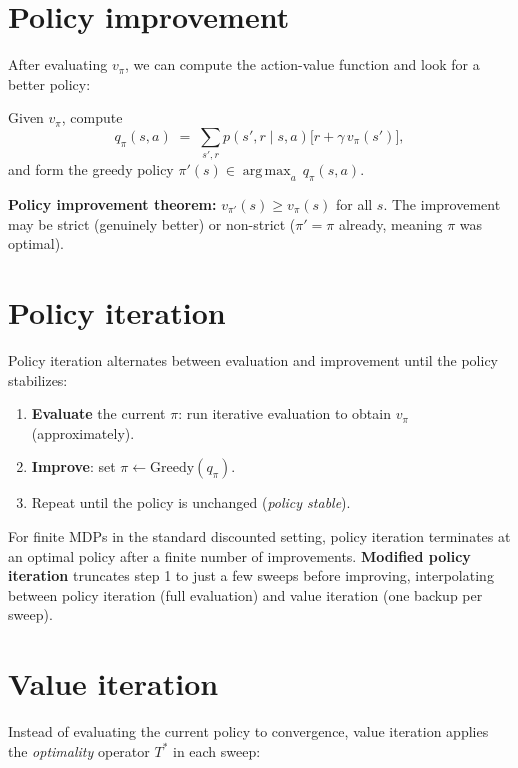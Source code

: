 \documentclass[11pt, oneside]{book}
\newcommand{\argmax}{\operatorname*{arg\,max}}
\begin{document}
\section{Policy improvement}

After evaluating $v_\pi$, we can compute the action-value function and look
for a better policy:

\begin{thmbox}[title={Policy Improvement}]
Given $v_\pi$, compute
\[
  q_\pi(s,a) \;=\; \sum_{s',r} p(s',r\mid s,a)\bigl[r + \gamma\,v_\pi(s')\bigr],
\]
and form the greedy policy $\pi'(s) \in \argmax_a\,q_\pi(s,a)$.

\textbf{Policy improvement theorem:} $v_{\pi'}(s) \ge v_\pi(s)$ for all $s$.
The improvement may be strict (genuinely better) or non-strict
($\pi' = \pi$ already, meaning $\pi$ was optimal).
\end{thmbox}

\section{Policy iteration}

Policy iteration alternates between evaluation and improvement until the
policy stabilizes:

\begin{enumerate}
  \item \textbf{Evaluate} the current $\pi$: run iterative evaluation to
    obtain $v_\pi$ (approximately).
  \item \textbf{Improve}: set $\pi \leftarrow \text{Greedy}(q_\pi)$.
  \item Repeat until the policy is unchanged (\emph{policy stable}).
\end{enumerate}

For finite MDPs in the standard discounted setting, policy iteration
terminates at an optimal policy after a finite number of improvements.
\textbf{Modified policy iteration} truncates step 1 to just a few sweeps
before improving, interpolating between policy iteration (full evaluation)
and value iteration (one backup per sweep).

\section{Value iteration}

Instead of evaluating the current policy to convergence, value iteration
applies the \emph{optimality} operator $T^*$ in each sweep:
\end{document}
